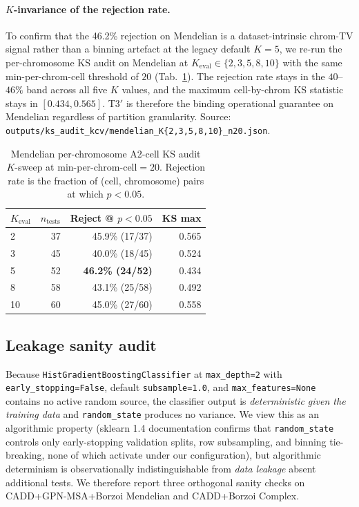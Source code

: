 \paragraph{$K$-invariance of the rejection rate.} To confirm that the 46.2\% rejection on Mendelian is a dataset-intrinsic chrom-TV signal rather than a binning artefact at the legacy default $K = 5$, we re-run the per-chromosome KS audit on Mendelian at $K_{\mathrm{eval}} \in \{2, 3, 5, 8, 10\}$ with the same min-per-chrom-cell threshold of $20$ (Tab.~\ref{tab:ks_kinvariance}). The rejection rate stays in the $40$--$46\%$ band across all five $K$ values, and the maximum cell-by-chrom KS statistic stays in $[0.434, 0.565]$. T3$'$ is therefore the binding operational guarantee on Mendelian regardless of partition granularity. Source: \texttt{outputs/ks\_audit\_kcv/mendelian\_K\{2,3,5,8,10\}\_n20.json}.

\begin{table}[h]
\centering
\small
\caption{Mendelian per-chromosome A2-cell KS audit $K$-sweep at min-per-chrom-cell$=20$. Rejection rate is the fraction of (cell, chromosome) pairs at which $p < 0.05$.}
\label{tab:ks_kinvariance}
\begin{tabular}{lrrr}
\toprule
$K_{\mathrm{eval}}$ & $n_{\text{tests}}$ & Reject @ $p{<}0.05$ & KS max \\
\midrule
2 & 37 & 45.9\% (17/37) & 0.565 \\
3 & 45 & 40.0\% (18/45) & 0.524 \\
5 & 52 & \textbf{46.2\% (24/52)} & 0.434 \\
8 & 58 & 43.1\% (25/58) & 0.492 \\
10 & 60 & 45.0\% (27/60) & 0.558 \\
\bottomrule
\end{tabular}
\end{table}

\subsection{Leakage sanity audit}
\label{app:data:leakage}

Because \texttt{HistGradientBoostingClassifier} at \texttt{max\_depth=2} with \texttt{early\_stopping=False}, default \texttt{subsample=1.0}, and \texttt{max\_features=None} contains no active random source, the classifier output is \emph{deterministic given the training data} and \texttt{random\_state} produces no variance. We view this as an algorithmic property (sklearn 1.4 documentation confirms that \texttt{random\_state} controls only early-stopping validation splits, row subsampling, and binning tie-breaking, none of which activate under our configuration), but algorithmic determinism is observationally indistinguishable from \emph{data leakage} absent additional tests. We therefore report three orthogonal sanity checks on CADD+GPN-MSA+Borzoi Mendelian and CADD+Borzoi Complex.


